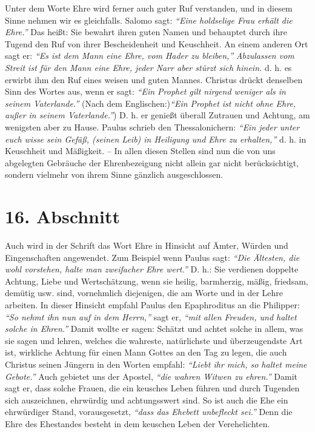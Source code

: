 Unter dem Worte Ehre wird ferner auch guter Ruf verstanden, und in diesem Sinne
nehmen wir es gleichfalls. Salomo sagt:
\textit{"`Eine holdselige Frau erhält die Ehre."'}
Das heißt: Sie bewahrt ihren guten Namen und
behauptet durch ihre Tugend den Ruf von ihrer Bescheidenheit und Keuschheit. An
einem anderen Ort sagt er:
\textit{"`Es ist dem Mann eine Ehre, vom Hader zu
bleiben,"'} \textit{Abzulassen vom Streit ist für den
Mann eine Ehre, jeder Narr aber stürzt sich hinein.}
d. h. es erwirbt ihm den Ruf eines weisen und
guten Mannes. Christus drückt denselben Sinn des Wortes aus, wenn er sagt:
\textit{"`Ein Prophet gilt nirgend weniger als in seinem
Vaterlande."'}
(Nach dem Englischen:)\textit{"`Ein Prophet ist nicht ohne Ehre, außer in seinem
Vaterlande."'}) D. h. er genießt überall Zutrauen und Achtung, am wenigsten aber
zu
Hause. Paulus schrieb den Thessalonichern:
\textit{"`Ein jeder unter euch wisse sein
Gefäß, (seinen Leib) in Heiligung und Ehre zu erhalten,"'}
d. h. in Keuschheit und Mäßigkeit. -- In allen diesen Stellen sind nun die
von uns abgelegten Gebräuche der Ehrenbezeigung nicht allein gar nicht
berücksichtigt, sondern vielmehr von ihrem Sinne gänzlich ausgeschlossen.

\section{16. Abschnitt} \label{kap9_ab16}

Auch wird in der Schrift das Wort Ehre in Hinsicht auf Ämter, Würden und
Eingenschaften angewendet. Zum Beispiel wenn Paulus sagt:
\textit{"`Die Ältesten, die wohl
vorstehen, halte man zweifacher Ehre wert."'}
D. h.: Sie
verdienen doppelte Achtung, Liebe und Wertschätzung, wenn sie heilig,
barmherzig, mäßig, friedsam, demütig usw. sind, vornehmlich diejenigen, die
am Worte und in der Lehre arbeiten. In dieser
Hinsicht empfahl Paulus den
Epaphroditus an die Philipper:
\textit{"`So nehmt ihn nun auf in dem Herrn,"'} sagt er,
\textit{"`mit allen Freuden, und haltet solche in Ehren."'}
Damit
wollte er sagen: Schätzt und achtet solche in allem, was sie sagen und lehren,
welches die wahreste, natürlichste und überzeugendste Art ist, wirkliche Achtung
für einen Mann Gottes an den Tag zu legen, die auch Christus seinen Jüngern in
den Worten empfahl:
\textit{"`Liebt ihr mich, so haltet meine Gebote."'}
Auch gebietet uns der Apostel,
\textit{"`die wahren Witwen zu ehren."'} Damit
sagt er, dass solche Frauen, die ein keusches Leben führen und durch Tugenden
sich auszeichnen, ehrwürdig und achtungsswert sind. So ist auch die Ehe ein
ehrwürdiger Stand, vorausgesetzt,
\textit{"`dass das Ehebett unbefleckt sei."'}
Denn die Ehre des Ehestandes besteht in dem keuschen
Leben der Verehelichten.

